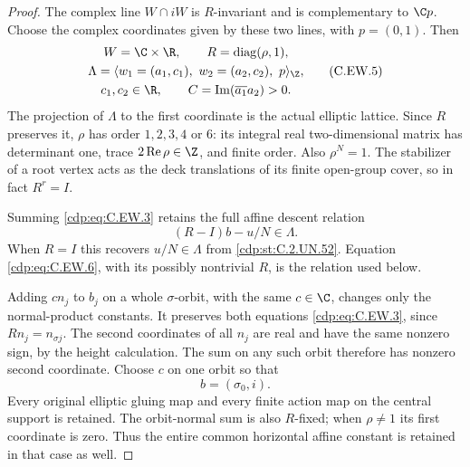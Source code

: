 \begin{proof}
The complex line $W\cap iW$ is $R$-invariant and is
complementary to $\C p$. Choose the complex coordinates
given by these two lines, with $p=(0,1)$. Then
\[
 \begin{gathered}
 W=\C\times\R,\qquad R=\operatorname{diag}(\rho,1),\\
 \Lambda=\langle w_1=(a_1,c_1),\ w_2=(a_2,c_2),\ p\rangle_{\Z},\\
 c_1,c_2\in\R,\qquad
 C=\operatorname{Im}(\overline{a_1}a_2)>0.
 \end{gathered}
\tag{C.EW.5}\label{cdp:eq:C.EW.5}
\]
The projection of $\Lambda$ to the first coordinate is
the actual elliptic lattice. Since $R$ preserves it,
$\rho$ has order $1,2,3,4$ or $6$: its integral real
two-dimensional matrix has determinant one, trace
$2\operatorname{Re}\rho\in\Z$, and finite order.
Also $\rho^N=1$. The stabilizer of a root vertex acts
as the deck translations of its finite open-group cover,
so in fact $R^r=I$.

Summing \eqref{cdp:eq:C.EW.3} retains the full affine descent relation
\[
                         (R-I)b-u/N\in\Lambda.
\tag{C.EW.6}\label{cdp:eq:C.EW.6}
\]
When $R=I$ this recovers $u/N\in\Lambda$ from \ref{cdp:st:C.2.UN.52}.
Equation \eqref{cdp:eq:C.EW.6}, with its possibly nontrivial $R$, is
the relation used below.

Adding $c n_j$ to $b_j$ on a whole $\sigma$-orbit,
with the same $c\in\C$, changes only the normal-product
constants. It preserves both equations \eqref{cdp:eq:C.EW.3}, since
$Rn_j=n_{\sigma j}$. The second coordinates of all
$n_j$ are real and have the same nonzero sign, by the
height calculation. The sum on any such orbit therefore
has nonzero second coordinate. Choose $c$ on one orbit
so that
\[
                              b=(\sigma_0,i).
\tag{C.EW.7}\label{cdp:eq:C.EW.7}
\]
Every original elliptic gluing map and every finite
action map on the central support is retained.
The orbit-normal sum is also $R$-fixed; when
$\rho\ne1$ its first coordinate is zero. Thus the
entire common horizontal affine constant is retained
in that case as well.


\end{proof}
